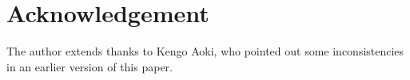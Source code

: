 \documentclass[12pt, reqno]{amsart}
\theoremstyle{plain}
\theoremstyle{definition}
\numberwithin{equation}{section}
\begin{document}
%
%
%
%
%
%
%
%


\section*{Acknowledgement}

The author extends thanks to Kengo Aoki, who pointed out some inconsistencies in an earlier version of this paper.





\end{document}
